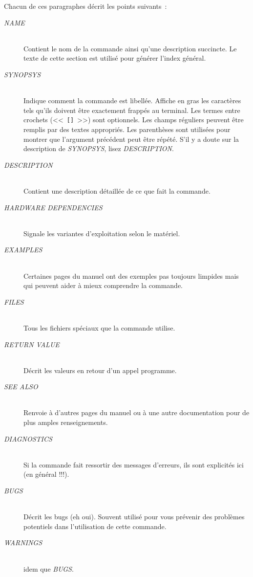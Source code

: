 Chacun de ces paragraphes d{\'e}crit les points suivants~:
\begin{description}
	\item[{\sl NAME}]\mbox{}\\
		Contient le nom de la commande ainsi qu'une description
		succincte. Le texte de cette section est utilis{\'e} pour  g{\'e}n{\'e}rer
		l'index g{\'e}n{\'e}ral.

	\item[{\sl SYNOPSYS}]\mbox{}\\
		Indique comment la commande est libell{\'e}e. Affiche en gras les
		caract{\`e}res tels qu'ils doivent {\^e}tre exactement frapp{\'e}s au terminal.
		Les termes entre crochets (<<~{\tt []}~>>) sont optionnels. Les champs
		r{\'e}guliers peuvent {\^e}tre remplis par des textes appropri{\'e}s. Les
		parenth{\`e}ses sont utilis{\'e}es pour montrer que l'argument pr{\'e}c{\'e}dent
		peut {\^e}tre r{\'e}p{\'e}t{\'e}. S'il y a doute sur la description de {\sl SYNOPSYS},
		lisez {\sl DESCRIPTION}.

	\item[{\sl DESCRIPTION}]\mbox{}\\
		Contient une description d{\'e}taill{\'e}e de ce que fait la commande.

	\item[{\sl HARDWARE DEPENDENCIES}]\mbox{}\\
		Signale les variantes d'exploitation selon le mat{\'e}riel.

	\item[{\sl EXAMPLES}]\mbox{}\\
		Certaines pages du manuel ont des exemples pas toujours limpides
		mais qui peuvent aider {\`a} mieux comprendre la commande.

	\item[{\sl FILES}]\mbox{}\\
		Tous les fichiers sp{\'e}ciaux que la commande utilise.

	\item[{\sl RETURN VALUE}]\mbox{}\\
		D{\'e}crit les valeurs en retour d'un appel programme.

	\item[{\sl SEE ALSO}]\mbox{}\\
		Renvoie {\`a} d'autres pages du manuel ou {\`a} une autre documentation
		pour de plus amples renseignements.

	\item[{\sl DIAGNOSTICS}]\mbox{}\\
		Si la commande fait ressortir des messages d'erreurs, ils sont
		explicit{\'e}s ici (en g{\'e}n{\'e}ral !!!).

	\item[{\sl BUGS}]\mbox{}\\
		D{\'e}crit les bugs (eh oui). Souvent utilis{\'e} pour vous pr{\'e}venir des
		probl{\`e}mes potentiels dans l'utilisation de cette commande.

	\item[{\sl WARNINGS}]\mbox{}\\
		idem que {\sl BUGS}.
\end{description}

